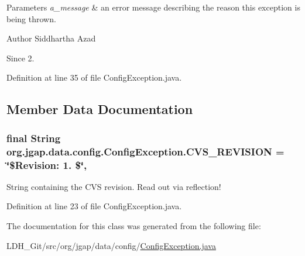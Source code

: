 \begin{DoxyParams}{Parameters}
{\em a\-\_\-message} & an error message describing the reason this exception is being thrown.\\
\hline
\end{DoxyParams}
\begin{DoxyAuthor}{Author}
Siddhartha Azad 
\end{DoxyAuthor}
\begin{DoxySince}{Since}
2. 
\end{DoxySince}


Definition at line 35 of file Config\-Exception.\-java.



\subsection{Member Data Documentation}
\hypertarget{classorg_1_1jgap_1_1data_1_1config_1_1_config_exception_a4c0a3816df0e400c6872d2ad5c470b0e}{
\subsubsection[{C\-V\-S\-\_\-\-R\-E\-V\-I\-S\-I\-O\-N}]{\setlength{\rightskip}{0pt plus 5cm}final String org.\-jgap.\-data.\-config.\-Config\-Exception.\-C\-V\-S\-\_\-\-R\-E\-V\-I\-S\-I\-O\-N = \char`\"{}\$Revision\-: 1. \$\char`\"{}\hspace{0.3cm}{\ttfamily [static]}, {\ttfamily [private]}}}\label{classorg_1_1jgap_1_1data_1_1config_1_1_config_exception_a4c0a3816df0e400c6872d2ad5c470b0e}
String containing the C\-V\-S revision. Read out via reflection! 

Definition at line 23 of file Config\-Exception.\-java.



The documentation for this class was generated from the following file\-:\begin{DoxyCompactItemize}
\item 
L\-D\-H\-\_\-\-Git/src/org/jgap/data/config/\hyperlink{_config_exception_8java}{Config\-Exception.\-java}\end{DoxyCompactItemize}
